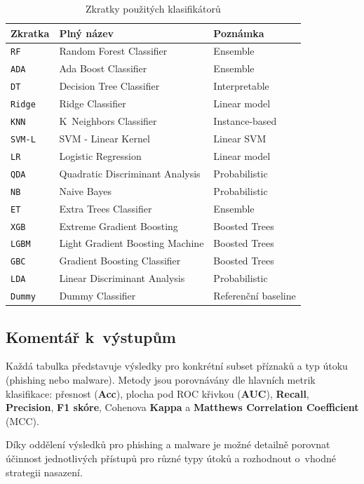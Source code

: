 \begin{table}[H]
    \centering
    \caption{Zkratky použitých klasifikátorů}
    \label{tab:model_abbreviations}
    \begin{tabular}{|l|l|l|}
        \hline
        \textbf{Zkratka} & \textbf{Plný název} & \textbf{Poznámka} \\
        \hline
        \texttt{RF} & Random Forest Classifier & Ensemble \\
        \texttt{ADA} & Ada Boost Classifier & Ensemble \\
        \texttt{DT} & Decision Tree Classifier & Interpretable \\
        \texttt{Ridge} & Ridge Classifier & Linear model \\
        \texttt{KNN} & K~Neighbors Classifier & Instance-based \\
        \texttt{SVM-L} & SVM - Linear Kernel & Linear SVM \\
        \texttt{LR} & Logistic Regression & Linear model \\
        \texttt{QDA} & Quadratic Discriminant Analysis & Probabilistic \\
        \texttt{NB} & Naive Bayes & Probabilistic \\
        \texttt{ET} & Extra Trees Classifier & Ensemble \\
        \texttt{XGB} & Extreme Gradient Boosting & Boosted Trees \\
        \texttt{LGBM} & Light Gradient Boosting Machine & Boosted Trees \\
        \texttt{GBC} & Gradient Boosting Classifier & Boosted Trees \\
        \texttt{LDA} & Linear Discriminant Analysis & Probabilistic \\
        \texttt{Dummy} & Dummy Classifier & Referenční baseline \\
        \hline
    \end{tabular}
\end{table}

\subsection*{Komentář k~výstupům}

Každá tabulka představuje výsledky pro konkrétní subset příznaků a typ útoku (phishing nebo malware).  
Metody jsou porovnávány dle hlavních metrik klasifikace: přesnost (\textbf{Acc}), plocha pod ROC křivkou (\textbf{AUC}), \textbf{Recall}, \textbf{Precision}, \textbf{F1 skóre}, Cohenova \textbf{Kappa} a \textbf{Matthews Correlation Coefficient} (MCC).

Díky oddělení výsledků pro phishing a malware je možné detailně porovnat účinnost jednotlivých přístupů pro různé typy útoků a rozhodnout o~vhodné strategii nasazení.

\bigskip







